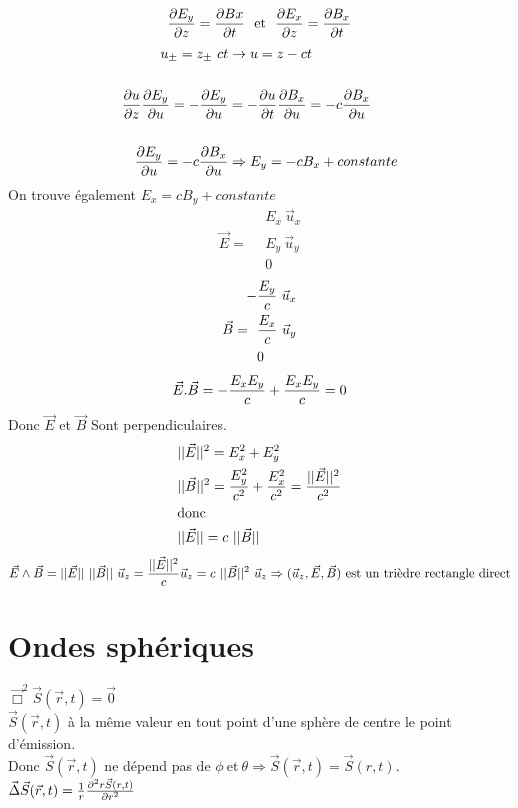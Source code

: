 \documentclass[11pt,a4paper,french]{article}
\begin{document}
$${\partial E_y \over \partial z} = {\partial Bx \over \partial t}~~\text{et}~~ {\partial E_x \over \partial z} = {\partial B_x \over \partial t}$$
\begin{align*}
u_\pm = z_\pm~ct &\rightarrow u = z-ct \\ \\
{\partial u \over \partial z}{\partial E_y \over \partial u} = -{\partial E_y \over \partial u} &= -{\partial u \over \partial t}{\partial B_x \over \partial u} =-c {\partial B_x \over \partial u}\\ \\
{\partial E_y \over \partial u} = -c {\partial B_x \over \partial u} &\Rightarrow E_y = -cB_x + constante
\end{align*}
On trouve également $E_x = cB_y + constante$
\begin{align*}
& E_x~\vec u_x \\
\vec E = ~~& E_y~\vec u_y \\
& 0
\end{align*}
\begin{align*}
 -&{E_y \over c}~\vec u_x \\
\vec B = ~~ &{E_x \over c}~\vec u_y \\
&0
\end{align*}
$$\vec E . \vec B = -{E_x E_y \over c} + {E_x E_y \over c} = 0$$
Donc $\vec E$ et $\vec B$ Sont perpendiculaires.
\clearpage
\begin{align*}
&||\vec E||^2 = E_x^2 + E_y^2 \\ 
&||\vec B||^2 = {E_y^2 \over c^2} + {E_x^2 \over c^2} = {||\vec E||^2 \over c^2} \\
& \text{donc} \\
&||\vec E|| = c~||\vec B||
\end{align*}
$$\vec E \wedge \vec B = ||\vec E||~||\vec B||~\vec u_z = {||\vec E||^2 \over c}\vec u_z = c~||\vec B||^2 ~\vec u_z \Rightarrow (\vec u_z, \vec E,\vec B)~\text{est un trièdre rectangle direct}$$
\section{Ondes sphériques}
$\vec \Box^2 \vec S(\vec r, t) = \vec 0$ \\
$\vec S(\vec r, t)$ à la même valeur en tout point d'une sphère de centre le point d'émission. \\
Donc $\vec S(\vec r, t)$ ne dépend pas de $\phi~\text{et}~\theta \Rightarrow \vec S(\vec r, t) = \vec S(r, t)$. \\
$\vec \Delta \vec S(\vec r, t) = {1 \over r}{\partial^2 r \vec S(r, t) \over {\partial r}^2}$
\end{document}

